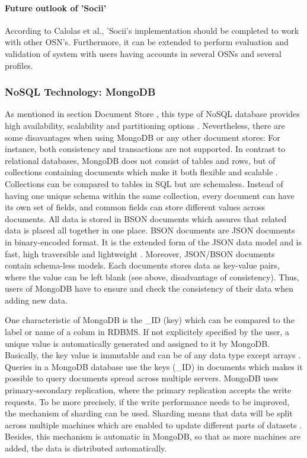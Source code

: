 \paragraph{Future outlook of 'Socii'}

According to Calolas et al., 'Socii's implementation should be completed to work with other OSN's. Furthermore, it can be extended to perform evaluation and validation of system with users having accounts in several OSNs and several profiles. 

\subsubsection{NoSQL Technology: MongoDB}\label{mongodb}

As mentioned in section Document Store \pageref{documentstore}, this type of NoSQL database provides high availability, scalability and partitioning options \cite[p.25 ff.]{mongodb_edward}. Nevertheless, there are some disavantages when using MongoDB or any other document stores: For instance, both consistency and transactions are not supported. 
In contrast to relational databases, MongoDB does not consist of tables and rows, but of collections containing documents which make it both flexible and scalable \cite[p.25 ff.]{mongodb_edward}. Collections can be compared to tables in SQL but are schemaless. Instead of having one unique schema within the same collection, every document can have its own set of fields, and common fields can store different values across documents.  
All data is stored in \ac{BSON} documents which assures that related data is placed all together in one place. BSON documents are JSON documents in binary-encoded format. It is the extended form of the JSON data model and is fast, high traversible and lightweight \cite[p.31 ff.]{mongodb_edward}. Moreover, JSON/BSON documents contain schema-less models. Each documents stores data as key-value pairs, where the value can be left blank (see above, disadvantage of consistency). Thus, users of MongoDB have to ensure and check the consistency of their data when adding new data.

One characteristic of MongoDB is the _ID (key) which can be compared to the label or name of a colum in RDBMS. If not explicitely specified by the user, a unique value is automatically generated and assigned  to it by MongoDB. Basically, the key value is immutable and can be of any data type except arrays \cite[p.31 ff.]{mongodb_edward}.
Queries in a MongoDB database use the keys (_ID) in documents which makes it possible to query documents spread across multiple servers. 
MongoDB uses primary-secondary replication, where the primary replication accepts the write requests. To be more precisely, if the write performance needs to be improved, the mechanism of sharding can be used. Sharding means that data will be split across multiple machines which are enabled to update different parts of datasets \cite[p.25 ff.]{mongodb_edward}. Besides, this mechanism is automatic in MongoDB, so that as more machines are added, the data is distributed automatically.

